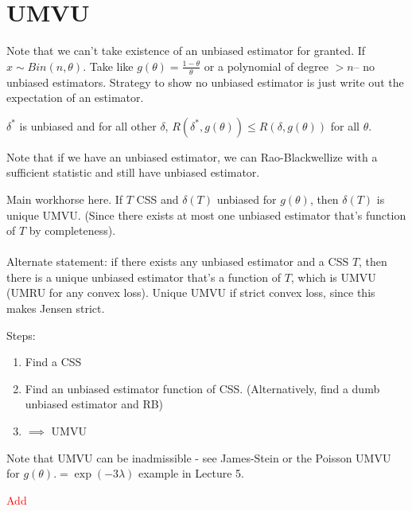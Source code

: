 \documentclass{article}
\newcommand\myworries[1]{\textcolor{red}{#1}}
\begin{document}
\section{UMVU}
Note that we can't take existence of an unbiased estimator for granted. If $x\sim Bin(n,\theta)$. Take like $g(\theta) = \frac{1-\theta}{\theta}$ or a polynomial of degree $>n$-- no unbiased estimators. Strategy to show no unbiased estimator is just write out the expectation of an estimator.
\begin{definition}[UMVU]
$\delta^*$ is unbiased and for all other $\delta$, $R(\delta^*,g(\theta)) \leq R(\delta,g(\theta))$ for all $\theta$.
\end{definition}
Note that if we have an unbiased estimator, we can Rao-Blackwellize with a sufficient statistic and still have unbiased estimator. 
\begin{theorem}
Main workhorse here.
If $T$ CSS and $\delta(T)$ unbiased for $g(\theta)$, then $\delta(T)$ is unique UMVU. (Since there exists at most one unbiased estimator that's function of $T$ by completeness).\\\\
Alternate statement: if there exists any unbiased estimator and a CSS $T$, then there is a unique unbiased estimator that's a function of $T$, which is UMVU (UMRU for any convex loss). Unique UMVU if strict convex loss, since this makes Jensen strict. 

\end{theorem}
\begin{recipe}Steps:
	\begin{enumerate}
	\item Find a CSS
	\item Find an unbiased estimator function of CSS. (Alternatively, find a dumb unbiased estimator and RB)
	\item $\implies$ UMVU
\end{enumerate}
\end{recipe}
Note that UMVU can be inadmissible - see James-Stein or the Poisson UMVU for $g(\theta).= \exp(-3\lambda)$ example in Lecture 5. 
\begin{theorem}
\myworries{Add}
\end{theorem}
\end{document}
